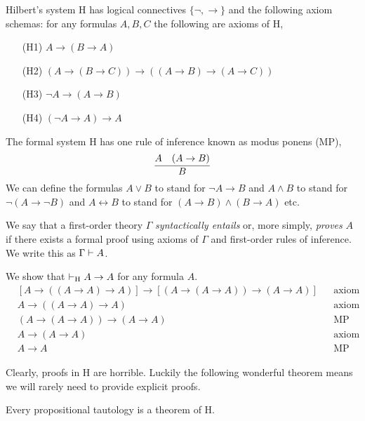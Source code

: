 \documentclass[12pt]{article}
\begin{document}
\begin{definition}
Hilbert's system H has logical connectives $\{\neg, \to\}$ and the following axiom schemas: for any formulas $A, B, C$ the following are axioms of H,
\begin{enumerate}
\item[(H1)] $A \to (B \to A)$
\item[(H2)] $(A \to (B \to C)) \to ((A \to B) \to (A \to C))$
\item[(H3)] $\neg A \to (A \to B)$
\item[(H4)] $(\neg A \to A) \to A$
\end{enumerate} 
The formal system H has one rule of inference known as modus ponens (MP),
\[ \infer{B}{A & (A \rightarrow B)} \]
We can define the formulas $A \vee B$ to stand for $\neg A \to B$ and $A \wedge B$ to stand for $\neg (A \to \neg B)$ and $A \leftrightarrow B$ to stand for $(A \to B) \wedge (B \to A)$ etc. 
\end{definition} 

\begin{definition}
We say that a first-order theory $\Gamma$ \textit{syntactically entails} or, more simply, \textit{proves} $A$ if there exists a formal proof using axioms of $\Gamma$ and first-order rules of inference. We write this as $\Gamma \vdash A$.
\end{definition}

\begin{example}
We show that $\vdash_{\text{H}} A \to A$ for any formula $A$. 
\begin{align}
& [A \to ((A \to A) \to A)] \to [(A \to (A \to A)) \to (A \to A)]  && \text{axiom (L2)}
\\
& A \to ((A \to A) \to A)  && \text{axiom (L1)}
\\
& (A \to (A \to A)) \to (A \to A)  && \text{MP 1,2}
\\
& A \to (A \to A)  && \text{axiom (L1)}
\\
& A \to A && \text{MP 3,4}
\end{align} 
\end{example}

\begin{remark}
Clearly, proofs in H are horrible. Luckily the following wonderful theorem means we will rarely need to provide explicit proofs. 
\end{remark}

\begin{theorem}[G\"{o}del]
Every propositional tautology is a theorem of H.
\end{theorem}
\end{document}
